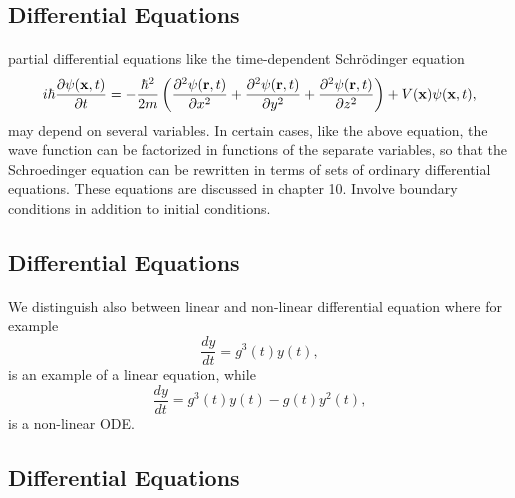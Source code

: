 \documentclass[%
oneside,                 %
final,                   %
10pt]{article}
\begin{document}
\subsection*{Differential Equations}

\paragraph{}
partial differential equations like the time-dependent Schr\"odinger
equation 
\begin{equation}
   i\hbar\frac{\partial \psi({\bf x},t)}{\partial t}=
   -\frac{\hbar^2}{2m}\left( \frac{\partial^2 \psi({\bf r},t)}{\partial x^2} +
                            \frac{\partial^2 \psi({\bf r},t)}{\partial y^2}+
                            \frac{\partial^2 \psi({\bf r},t)}{\partial z^2}\right) + V({\bf x})\psi({\bf x},t),
\end{equation}
may depend on several variables. In certain cases, like the above
equation, the wave function can be factorized in functions of the separate
variables, so that the Schroedinger equation 
can be rewritten in terms of sets of ordinary differential equations.
These equations are discussed in chapter 10. Involve boundary conditions in addition to initial conditions.



\subsection*{Differential Equations}

\paragraph{}
We distinguish also between linear and non-linear differential
equation where for example
\begin{equation} 
   \frac{dy}{dt}=g^3(t)y(t),
\end{equation}
is an example of a linear equation, while 
\begin{equation} 
   \frac{dy}{dt}=g^3(t)y(t)-g(t)y^2(t),
\end{equation}
is a non-linear ODE.



\subsection*{Differential Equations}
\end{document}

